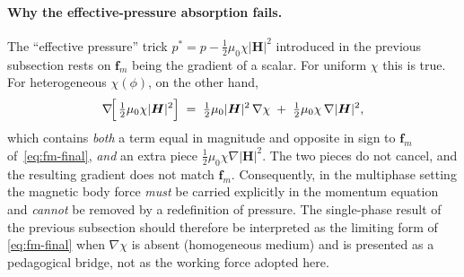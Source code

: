 \paragraph{Why the effective-pressure absorption fails.}
The ``effective pressure'' trick $p^{*} = p - \tfrac{1}{2}\mu_0\chi|\bm{H}|^{2}$ introduced in the previous subsection rests on $\bm{f}_m$ being the gradient of a scalar.
For uniform $\chi$ this is true. For heterogeneous $\chi(\phi)$, on the other hand,
\begin{equation}
\nabla\!\Bigl[\,\tfrac{1}{2}\mu_0\chi|\bm{H}|^{2}\Bigr]
\;=\; \tfrac{1}{2}\mu_0|\bm{H}|^{2}\,\nabla\chi
\;+\; \tfrac{1}{2}\mu_0\chi\,\nabla|\bm{H}|^{2},
\label{eq:would-be-gradient}
\end{equation}
which contains \emph{both} a term equal in magnitude and opposite in sign to $\bm{f}_m$ of~\eqref{eq:fm-final}, \emph{and} an extra piece $\tfrac{1}{2}\mu_0\chi\nabla|\bm{H}|^{2}$.
The two pieces do not cancel, and the resulting gradient does not match $\bm{f}_m$.
Consequently, in the multiphase setting the magnetic body force \emph{must} be carried explicitly in the momentum equation and \emph{cannot} be removed by a redefinition of pressure.
The single-phase result of the previous subsection should therefore be interpreted as the limiting form of \eqref{eq:fm-final} when $\nabla\chi$ is absent (homogeneous medium) and is presented as a pedagogical bridge, not as the working force adopted here.

